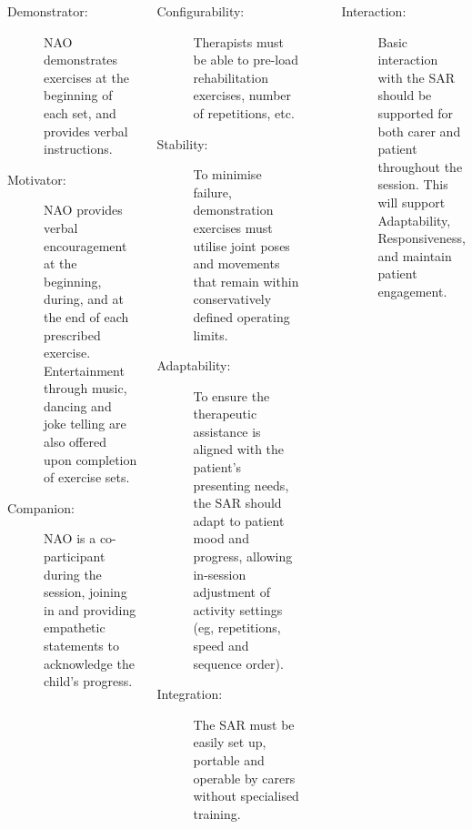 \documentclass[a0paper, portrait]{tikzposter}
\begin{document}
\begin{columns}
 {
    \begin{description}
    \item[Demonstrator:]  NAO demonstrates exercises
    at the beginning of each set, and provides verbal instructions.

    \item[Motivator:]  NAO provides verbal encouragement at the beginning, 
    during, and at the end of each prescribed exercise.  
    Entertainment through music, dancing and joke telling are also 
    offered upon completion of exercise sets.  

    \item[Companion:] NAO is a co-participant during the session,   
    joining in and providing empathetic statements to acknowledge the child's progress.
    \end{description}
 }

 {
  \begin{minipage}{0.31\columnwidth}

    \begin{description}
    \item [Configurability:] 
    Therapists must be able to pre-load rehabilitation exercises, number of repetitions, etc.
    
    \item [Stability:]
    To minimise failure, demonstration exercises must utilise joint poses 
    and movements that remain within conservatively defined operating limits. 
    
    \item [Adaptability:]
    To ensure the therapeutic assistance is aligned with the patient's presenting needs,
    the SAR should adapt to patient mood and progress, allowing 
    in-session adjustment of activity settings (eg, repetitions, speed and sequence order).

    \item [Integration:] 
    The SAR must be easily set up, portable and operable by carers without specialised training. 
    
    \end{description}
  \end{minipage}
  \begin{minipage}{0.01\columnwidth}
  \textcolor{white}{.}
  \end{minipage}
  \begin{minipage}{0.31\columnwidth}
    \begin{description}
    \item [Interaction:]
    Basic interaction with the SAR should be supported for both carer and patient throughout the session.
    This will support Adaptability, Responsiveness, and maintain patient engagement.
    

\end{description}
\end{minipage}}
\end{columns}
\end{document}
